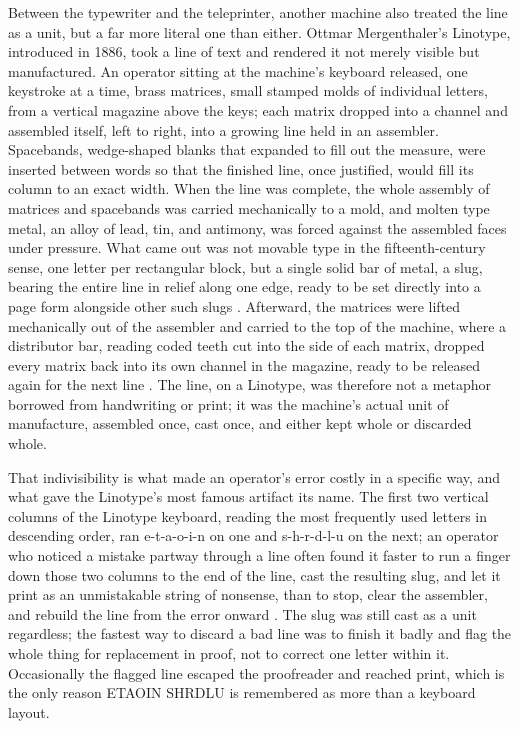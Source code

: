 \documentclass[11pt]{article}
\begin{document}
Between the typewriter and the teleprinter, another machine also treated the line as a unit, but a far more literal one than either. Ottmar Mergenthaler's Linotype, introduced in 1886, took a line of text and rendered it not merely visible but manufactured. An operator sitting at the machine's keyboard released, one keystroke at a time, brass matrices, small stamped molds of individual letters, from a vertical magazine above the keys; each matrix dropped into a channel and assembled itself, left to right, into a growing line held in an assembler. Spacebands, wedge-shaped blanks that expanded to fill out the measure, were inserted between words so that the finished line, once justified, would fill its column to an exact width. When the line was complete, the whole assembly of matrices and spacebands was carried mechanically to a mold, and molten type metal, an alloy of lead, tin, and antimony, was forced against the assembled faces under pressure. What came out was not movable type in the fifteenth-century sense, one letter per rectangular block, but a single solid bar of metal, a slug, bearing the entire line in relief along one edge, ready to be set directly into a page form alongside other such slugs \cite{linotypehistory2026}. Afterward, the matrices were lifted mechanically out of the assembler and carried to the top of the machine, where a distributor bar, reading coded teeth cut into the side of each matrix, dropped every matrix back into its own channel in the magazine, ready to be released again for the next line \cite{linotypedistributor2026}. The line, on a Linotype, was therefore not a metaphor borrowed from handwriting or print; it was the machine's actual unit of manufacture, assembled once, cast once, and either kept whole or discarded whole.

That indivisibility is what made an operator's error costly in a specific way, and what gave the Linotype's most famous artifact its name. The first two vertical columns of the Linotype keyboard, reading the most frequently used letters in descending order, ran e-t-a-o-i-n on one and s-h-r-d-l-u on the next; an operator who noticed a mistake partway through a line often found it faster to run a finger down those two columns to the end of the line, cast the resulting slug, and let it print as an unmistakable string of nonsense, than to stop, clear the assembler, and rebuild the line from the error onward \cite{etaoinshrdlu2018}. The slug was still cast as a unit regardless; the fastest way to discard a bad line was to finish it badly and flag the whole thing for replacement in proof, not to correct one letter within it. Occasionally the flagged line escaped the proofreader and reached print, which is the only reason ETAOIN SHRDLU is remembered as more than a keyboard layout.
\end{document}
